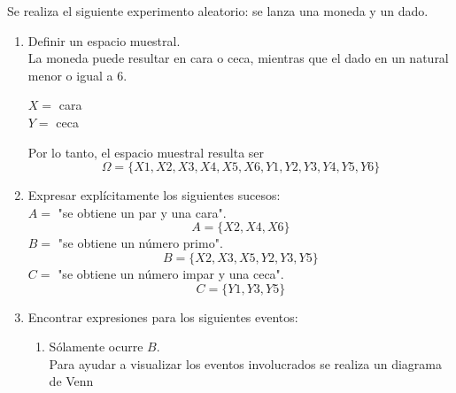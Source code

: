 \item Se realiza el siguiente experimento aleatorio: se lanza una moneda y un dado.
    \begin{enumerate}
        \item Definir un espacio muestral.\e\\
            La moneda puede resultar en cara o ceca, mientras que el dado en un natural menor o igual a 6.
            \begin{center}
                $X=$ cara\\
                $Y=$ ceca\\
            \end{center}
            Por lo tanto, el espacio muestral resulta ser\[\Omega=\{X1,X2,X3,X4,X5,X6,Y1,Y2,Y3,Y4,Y5,Y6\}\]
        \item Expresar explícitamente los siguientes sucesos:\\
            $A=$ "se obtiene un par y una cara".
            \[A=\{X2,X4,X6\}\]
            $B=$ "se obtiene un número primo".
            \[B=\{X2,X3,X5,Y2,Y3,Y5\}\]
            $C=$ "se obtiene un número impar y una ceca".
            \[C=\{Y1,Y3,Y5\}\]
        \item Encontrar expresiones para los siguientes eventos:
            \begin{enumerate}
                \item Sólamente ocurre $B$.\e\\
                    Para ayudar a visualizar los eventos involucrados se realiza un diagrama de Venn
                    \begin{center}
\end{center}
\end{enumerate}
\end{enumerate}
